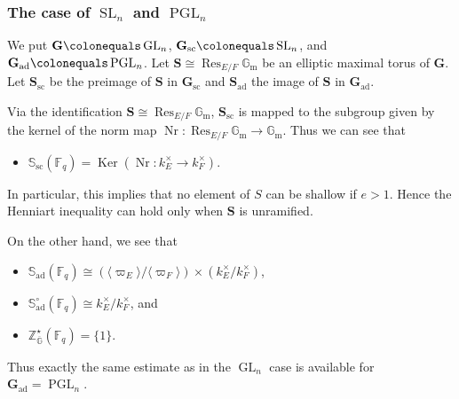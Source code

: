 \documentclass{amsart}
\newcommand{\ad}{\mathrm{ad}}
\renewcommand{\sc}{\mathrm{sc}}
\newcommand{\Z}{\mathbb{Z}}
\newcommand{\F}{\mathbb{F}}
\newcommand{\Gm}{\mathbb{G}_{\mathrm{m}}}
\newcommand{\bbS}{\mathbb{S}}
\newcommand{\bbG}{\mathbb{G}}
\newcommand{\bfG}{\mathbf{G}}
\newcommand{\bfS}{\mathbf{S}}
\DeclareMathOperator{\Ker}{Ker}
\DeclareMathOperator{\Nr}{Nr}
\DeclareMathOperator{\Res}{Res}
\DeclareMathOperator{\GL}{GL}
\DeclareMathOperator{\PGL}{PGL}
\DeclareMathOperator{\SL}{SL}
\theoremstyle{plain}
\theoremstyle{definition}
\theoremstyle{remark}
\theoremstyle{theorem}
\begin{document}
\subsubsection{The case of $\SL_{n}$ and $\PGL_{n}$}\label{subsubsec:Henn-SL-PGL}

We put $\bfG\colonequals \GL_{n}$, $\bfG_{\sc}\colonequals \SL_{n}$, and $\bfG_{\ad}\colonequals \PGL_{n}$.
Let $\bfS\cong\Res_{E/F}\Gm$ be an elliptic maximal torus of $\bfG$.
Let $\bfS_{\sc}$ be the preimage of $\bfS$ in $\bfG_{\sc}$ and $\bfS_{\ad}$ the image of $\bfS$ in $\bfG_{\ad}$.

Via the identification $\bfS\cong\Res_{E/F}\Gm$, $\bfS_{\sc}$ is mapped to the subgroup given by the kernel of the norm map $\Nr\colon \Res_{E/F}\Gm\rightarrow\Gm$.
Thus we can see that
\begin{itemize}
\item
$\bbS_{\sc}(\F_{q})=\Ker(\Nr\colon k_{E}^{\times}\rightarrow k_{F}^{\times})$.
\end{itemize}
In particular, this implies that no element of $S$ can be shallow if $e>1$.
Hence the Henniart inequality can hold only when $\bfS$ is unramified.

On the other hand, we see that
\begin{itemize}
\item
$\bbS_{\ad}(\F_{q})\cong (\langle\varpi_{E}\rangle/\langle\varpi_{F}\rangle)\times (k_{E}^{\times}/k_{F}^{\times})$,
\item
$\bbS_{\ad}^{\circ}(\F_{q})\cong k_{E}^{\times}/k_{F}^{\times}$, and
\item
$\Z^{\star}_{\overline{\bbG}}(\F_{q})=\{1\}$.
\end{itemize}
Thus exactly the same estimate as in the $\GL_{n}$ case is available for $\bfG_{\ad}=\PGL_{n}$.


\newpage
\end{document}
